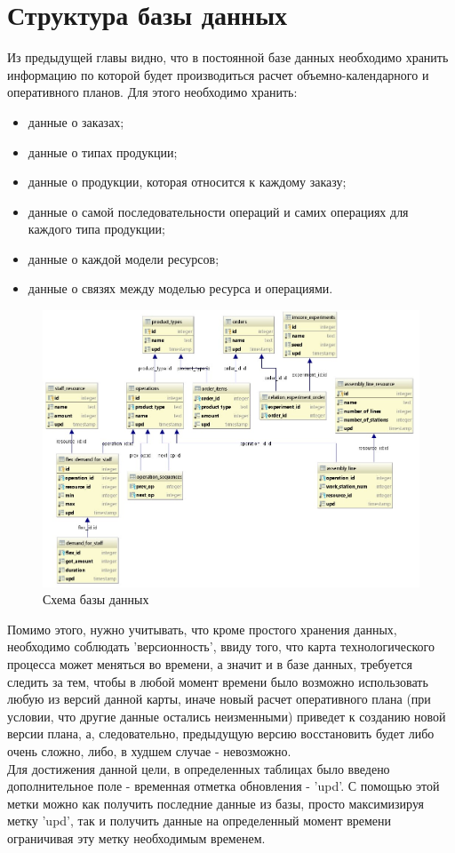 \section*{Структура базы данных}

\indent Из предыдущей главы видно, что в постоянной базе данных необходимо хранить информацию по которой будет производиться расчет объемно-календарного и оперативного планов.
Для этого необходимо хранить:

\begin{itemize}
	\item данные о заказах;
	\item данные о типах продукции;
	\item данные о продукции, которая относится к каждому заказу;
	\item данные о самой последовательности операций и самих операциях для каждого типа продукции;
	\item данные о каждой модели ресурсов;
	\item данные о связях между моделью ресурса и операциями.
\end{itemize}

\begin{figure}[ht]	
	\centering	
	\includegraphics[width=\linewidth]{pics/databaseSchema.png}
	\caption{Схема базы данных}
	\label{fig:dbSchema}
\end{figure}

\indent Помимо этого, нужно учитывать, что кроме простого хранения данных, необходимо соблюдать 'версионность', ввиду того, что карта технологического процесса может меняться во времени, а значит и в базе данных, требуется следить за тем, чтобы в любой момент времени было возможно использовать любую из версий данной карты, иначе новый расчет оперативного плана (при условии, что другие данные остались неизменными) приведет к созданию новой версии плана, а, следовательно, предыдущую версию восстановить будет либо очень сложно, либо, в худшем случае - невозможно.\\
\indent Для достижения данной цели, в определенных таблицах было введено дополнительное поле - временная отметка обновления - 'upd'.
С помощью этой метки можно как получить последние данные из базы, просто максимизируя метку 'upd', так и получить данные на определенный момент времени ограничивая эту метку необходимым временем.

